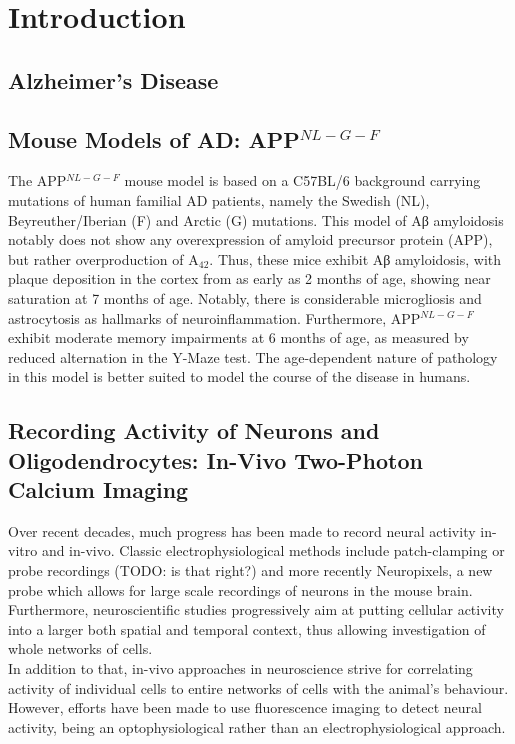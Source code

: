\chapter{\label{ch:1-intro}Introduction} 

\minitoc

\section{Alzheimer's Disease}
\section{Mouse Models of AD: APP$^{NL-G-F}$}
The APP$^{NL-G-F}$ mouse model is based on a C57BL/6 background carrying mutations of human familial AD patients, namely the Swedish (NL), Beyreuther/Iberian (F) and Arctic (G) mutations.
This model of Aβ amyloidosis notably does not show any overexpression of amyloid precursor protein (APP), but rather overproduction of A\textbeta$_{42}$. Thus, these mice exhibit Aβ amyloidosis, with plaque deposition in the cortex from as early as 2 months of age, showing near saturation at 7 months of age. Notably, there is considerable microgliosis and astrocytosis as hallmarks of neuroinflammation. Furthermore,  APP$^{NL-G-F}$ exhibit moderate memory impairments at 6 months of age, as measured by reduced alternation in the Y-Maze test. The age-dependent nature of pathology in this model is better suited to model the course of the disease in humans. \citep{Saito2014}
\section{Recording Activity of Neurons and Oligodendrocytes: In-Vivo Two-Photon Calcium Imaging}
Over recent decades, much progress has been made to record neural activity in-vitro and in-vivo. Classic electrophysiological methods include patch-clamping or probe recordings (TODO: is that right?) and more recently Neuropixels, a new probe which allows for large scale recordings of neurons in the mouse brain. \\
Furthermore, neuroscientific studies progressively aim at putting cellular activity into a larger both spatial and temporal context, thus allowing investigation of whole networks of cells. \cite{Denk2005}\\
In addition to that, in-vivo approaches in neuroscience strive for correlating activity of individual cells to entire networks of cells with the animal's behaviour. \cite{Denk2005}
However, efforts have been made to use fluorescence imaging to detect neural activity, being an optophysiological rather than an electrophysiological approach. 
